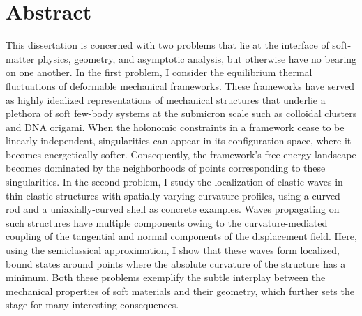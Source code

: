 


\frontmatter


%   


\chapter*{Abstract}
\thispagestyle{empty}

This dissertation is concerned with two problems that lie at the interface of soft-matter physics, geometry, and asymptotic analysis, but otherwise have no bearing on one another.  In the first problem, I consider the equilibrium thermal fluctuations of deformable mechanical frameworks.  These frameworks have served as highly idealized representations of mechanical structures that underlie a plethora of soft few-body systems at the submicron scale such as colloidal clusters and DNA origami.  When the holonomic constraints in a framework cease to be linearly independent, singularities can appear in its configuration space, where it becomes energetically softer.  Consequently, the framework's free-energy landscape becomes dominated by the neighborhoods of points corresponding to these singularities.  In the second problem, I study the localization of elastic waves in thin elastic structures with spatially varying curvature profiles, using a curved rod and a uniaxially-curved shell as concrete examples.  Waves propagating on such structures have multiple components owing to the curvature-mediated coupling of the tangential and normal components of the displacement field.  Here, using the semiclassical approximation, I show that these waves form localized, bound states around points where the absolute curvature of the structure has a minimum.  Both these problems exemplify the subtle interplay between the mechanical properties of soft materials and their geometry, which further sets the stage for many interesting consequences.

\ifdeadtree
  \blankpage
\fi

